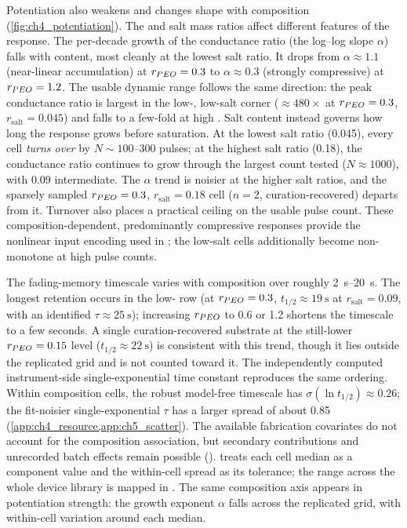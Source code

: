 \documentclass[12pt, twoside]{report}
\begin{document}
Potentiation also weakens and changes shape with composition (\cref{fig:ch4_potentiation}). The \PEO{} and salt mass ratios affect different features of the response. The per-decade growth of the conductance ratio (the log--log slope $\alpha$) falls with \PEO{} content, most cleanly at the lowest salt ratio. It drops from $\alpha\approx 1.1$ (near-linear accumulation) at \(r_{PEO{}}=\num{0.3}\) to $\alpha\approx 0.3$ (strongly compressive) at \(r_{PEO{}}=\num{1.2}\). The usable dynamic range follows the same direction: the peak conductance ratio is largest in the low-\PEO{}, low-salt corner ($\approx 480\times$ at \(r_{PEO{}}=\num{0.3}\), \(r_{\mathrm{salt}}=\num{0.045}\)) and falls to a few-fold at high \PEO{}. Salt content instead governs how long the response grows before saturation. At the lowest salt ratio (\num{0.045}), every cell \emph{turns over} by $N\sim\numrange{100}{300}$ pulses; at the highest salt ratio (\num{0.18}), the conductance ratio continues to grow through the largest count tested ($N\approx 1000$), with \num{0.09} intermediate. The $\alpha$ trend is noisier at the higher salt ratios, and the sparsely sampled \(r_{PEO{}}=\num{0.3}\), \(r_{\mathrm{salt}}=\num{0.18}\) cell ($n=2$, curation-recovered) departs from it. Turnover also places a practical ceiling on the usable pulse count. These composition-dependent, predominantly compressive responses provide the nonlinear input encoding used in ; the low-salt cells additionally become non-monotone at high pulse counts.

The fading-memory timescale varies with composition over roughly \SIrange{2}{20}{\second}. The longest retention occurs in the low-\PEO{} row (at \(r_{PEO{}}=\num{0.3}\), \(t_{1/2}\approx\SI{19}{\second}\) at \(r_{\mathrm{salt}}=\num{0.09}\), with an identified \(\tau\approx\SI{25}{\second}\)); increasing \(r_{PEO{}}\) to \num{0.6} or \num{1.2} shortens the timescale to a few seconds. A single curation-recovered substrate at the still-lower \(r_{PEO{}}=\num{0.15}\) level (\(t_{1/2}\approx\SI{22}{\second}\)) is consistent with this trend, though it lies outside the replicated grid and is not counted toward it. The independently computed instrument-side single-exponential time constant reproduces the same ordering. Within composition cells, the robust model-free timescale has \(\sigma(\ln t_{1/2})\approx\num{0.26}\); the fit-noisier single-exponential \(\tau\) has a larger spread of about \num{0.85} (\cref{app:ch4_resource,app:ch5_scatter}). The available fabrication covariates do not account for the composition association, but secondary contributions and unrecorded batch effects remain possible ().  treats each cell median as a component value and the within-cell spread as its tolerance; the range across the whole device library is mapped in . The same composition axis appears in potentiation strength: the growth exponent \(\alpha\) falls across the replicated grid, with within-cell variation around each median.
\end{document}
